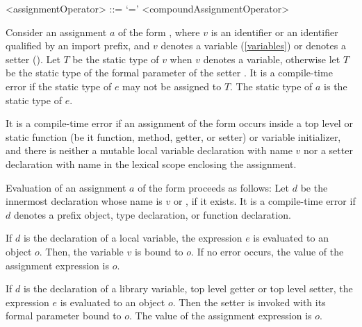 \documentclass[makeidx]{article}
\begin{document}
\begin{grammar}
<assignmentOperator> ::= `='
  \alt <compoundAssignmentOperator>
\end{grammar}

\LMHash{}%
Consider an assignment $a$ of the form ,
where $v$ is an identifier or an identifier qualified by an import prefix,
and $v$ denotes a variable (\ref{variables}) or  denotes a setter
().
Let $T$ be the static type of $v$ when $v$ denotes a variable,
otherwise let $T$ be the static type of the formal parameter of the setter .
It is a compile-time error if the static type of $e$ may not be assigned to $T$.
The static type of $a$ is the static type of $e$.

\LMHash{}%
It is a compile-time error if an assignment of the form  occurs
inside a top level or static function (be it function, method, getter, or setter) or variable initializer,
and there is neither a mutable local variable declaration with name $v$
nor a setter declaration with name  in the lexical scope enclosing the assignment.

\LMHash{}%
Evaluation of an assignment $a$ of the form 
proceeds as follows:
Let $d$ be the innermost declaration whose name is $v$ or , if it exists.
It is a compile-time error if $d$ denotes
a prefix object, type declaration, or function declaration.

\LMHash{}%
If $d$ is the declaration of a local variable, the expression $e$ is evaluated to an object $o$.
Then, the variable $v$ is bound to $o$.
If no error occurs, the value of the assignment expression is $o$.



\LMHash{}%
If $d$ is the declaration of a library variable, top level getter or top level setter, the expression $e$ is evaluated to an object $o$.
Then the setter  is invoked with its formal parameter bound to $o$.
The value of the assignment expression is $o$.
\end{document}
